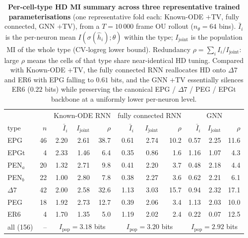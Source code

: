 \documentclass[11pt]{article}
\begin{document}
\begin{table}[H]
  \centering
  \small
  \caption{\textbf{Per-cell-type HD MI summary across three
  representative trained parameterisations} (one representative
  fold each: Known-ODE $+$TV, fully connected, GNN $+$TV), from a
  $T = 10\,000$ frame OU rollout ($n_\theta = 64$ bins). $\bar I_i$
  is the per-neuron mean $I(\sigma(\hat h_i);\theta)$ within the
  type; $I_{\mathrm{joint}}$ is the population MI of the whole type
  (CV-logreg lower bound). Redundancy $\rho = \sum_i I_i /
  I_{\mathrm{joint}}$: large $\rho$ means the cells of that type
  share near-identical HD tuning. Compared with Known-ODE $+$TV,
  the fully connected RNN reallocates HD onto $\Delta 7$ and ER6
  with EPG falling to $0.61$ bits, and the GNN $+$TV essentially
  silences ER6 ($0.22$ bits) while preserving the canonical
  EPG / $\Delta 7$ / PEG / EPGt backbone at a uniformly lower
  per-neuron level.}
  \label{tab:hd_mi_summary}
  \begin{tabular}{l|r|rrr|rrr|rrr}
    \toprule
    & & \multicolumn{3}{c|}{Known-ODE RNN}
      & \multicolumn{3}{c|}{fully connected RNN}
      & \multicolumn{3}{c}{GNN} \\
    type & $n$
      & $\bar I_i$ & $I_{\mathrm{joint}}$ & $\rho$
      & $\bar I_i$ & $I_{\mathrm{joint}}$ & $\rho$
      & $\bar I_i$ & $I_{\mathrm{joint}}$ & $\rho$ \\
    \midrule
    EPG    & 46 & 2.20 & 2.61 & 38.7 & 0.61 & 2.74 & 10.2 & 0.57 & 2.25 & 11.6 \\
    EPGt   &  4 & 2.33 & 1.46 &  6.4 & 0.35 & 0.86 &  1.6 & 1.16 & 1.07 &  4.3 \\
    PEN$_a$ & 20 & 1.32 & 2.71 &  9.8 & 0.41 & 2.20 &  3.7 & 0.48 & 2.18 &  4.4 \\
    PEN$_b$ & 22 & 1.00 & 2.80 &  7.8 & 0.38 & 2.27 &  3.6 & 0.62 & 2.21 &  6.1 \\
    $\Delta 7$ & 42 & 2.00 & 2.58 & 32.6 & 1.13 & 3.03 & 15.7 & 0.94 & 2.32 & 17.1 \\
    PEG    & 18 & 1.92 & 2.73 & 12.7 & 0.39 & 2.06 &  3.4 & 1.13 & 2.03 & 10.0 \\
    ER6    &  4 & 1.70 & 1.35 &  5.0 & 1.19 & 2.02 &  2.4 & 0.22 & 0.07 & 12.5 \\
    \midrule
    all (156) & --
      & \multicolumn{3}{c|}{$I_{\mathrm{pop}} = 3.18$ bits}
      & \multicolumn{3}{c|}{$I_{\mathrm{pop}} = 3.20$ bits}
      & \multicolumn{3}{c}{$I_{\mathrm{pop}} = 2.92$ bits} \\
    \bottomrule
  \end{tabular}
\end{table}
\end{document}
